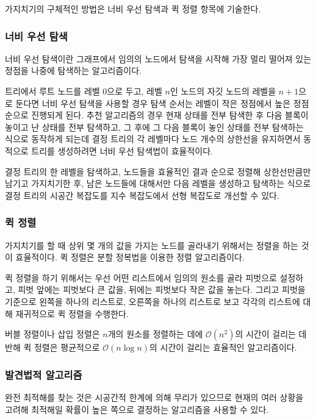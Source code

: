 가지치기의 구체적인 방법은 너비 우선 탐색과 퀵 정렬 항목에 기술한다.

\subsubsection{너비 우선 탐색}
너비 우선 탐색이란 그래프에서 임의의 노드에서 탐색을 시작해 가장 멀리 떨어져 있는 정점을 나중에 탐색하는 알고리즘이다.

트리에서 루트 노드를 레벨 0으로 두고, 레벨 $n$인 노드의 자깃 노드의 레벨을 $n+1$으로 둔다면 너비 우선 탐색을 사용할 경우 탐색 순서는 레벨이 작은 정점에서 높은 정점 순으로 진행되게 된다.
추천 알고리즘의 경우 현재 상태를 전부 탐색한 후 다음 블록이 놓이고 난 상태를 전부 탐색하고, 그 후에 그 다음 블록이 놓인 상태를 전부 탐색하는 식으로 동작하게 되는데 결정 트리의 각 레벨마다
노드 개수의 상한선을 유지하면서 동적으로 트리를 생성하려면 너비 우선 탐색법이 효율적이다.

결정 트리의 한 레벨을 탐색하고, 노드들을 효율적인 결과 순으로 정렬해 상한선만큼만 남기고 가지치기한 후,
남은 노드들에 대해서만 다음 레벨을 생성하고 탐색하는 식으로 결정 트리의 시공간 복잡도를 지수 복잡도에서 선형 복잡도로 개선할 수 있다.

\subsubsection{퀵 정렬} 가지치기를 할 때 상위 몇 개의 값을 가지는 노드를 골라내기 위해서는 정렬을 하는 것이 효율적이다.
퀵 정렬은 분할 정복법을 이용한 정렬 알고리즘\cite[p. 181]{CLRS}이다.

퀵 정렬을 하기 위해서는 우선 어떤 리스트에서
임의의 원소를 골라 피벗으로 설정하고, 피벗 앞에는 피벗보다 큰 값을, 뒤에는 피벗보다 작은 값을 놓는다. 그리고 피벗을 기준으로 왼쪽을 하나의 리스트로, 오른쪽을 하나의 리스트로 보고
각각의 리스트에 대해 재귀적으로 퀵 정렬을 수행한다.

버블 정렬이나 삽입 정렬은 $n$개의 원소를 정렬하는 데에 $\mathcal{O}\left(n^2\right)$의 시간이 걸리는 데 반해 퀵 정렬은 
평균적으로 $\mathcal{O}\left(n \log n\right)$의 시간이 걸리는 효율적인 알고리즘이다.\cite[p. 181]{CLRS}

\subsubsection{발견법적 알고리즘} 완전 최적해를 찾는 것은 시공간적 한계에 의해 무리가 있으므로 현재의 여러 상황을 고려해
최적해일 확률이 높은 쪽으로 결정하는 알고리즘을 사용할 수 있다.

